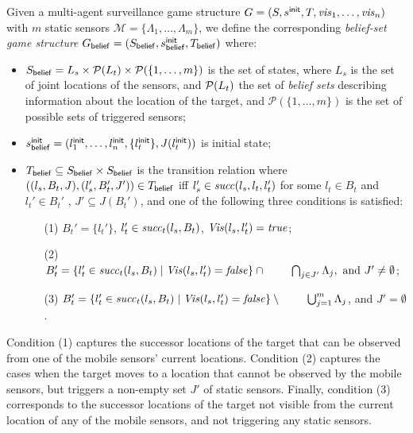 Given a  multi-agent surveillance game structure $G  = (S,s^{\mathsf{init}},T,\mathit{vis}_1,\ldots,\mathit{vis}_n)$ with $m$ static sensors $\mathcal{M} = \{\Lambda_1,\dots,\Lambda_m\}$, we define the corresponding \emph{belief-set game structure} $G_{\mathsf{belief}}  = (S_{\mathsf{belief}},s^{\mathsf{init}}_{\mathsf{belief}},T_{\mathsf{belief}})$ where:
\begin{itemize}
\item $S_{\mathsf{belief}} = L_s \times \mathcal{P}(L_t)\times \mathcal{P}(\{1,\ldots,m\})$ is the set of states, where $L_s$ is the set of joint locations of the sensors, and $\mathcal{P}(L_t)$ the set of \emph{belief sets} describing information about the location of the target, and $\mathcal{P}(\{1,\ldots,m\})$ is the set of possible sets of triggered sensors;
\item $s^{\mathsf{init}}_{\mathsf{belief}} = (l^{\mathsf{init}}_1,\ldots,l^{\mathsf{init}}_n,\{l_t^{\mathsf{init}}\},J(l_t^{\mathsf{init}}))$ is  initial state;
\item $T_{\mathsf{belief}} \subseteq S_{\mathsf{belief}} \times S_{\mathsf{belief}}$ is the transition relation where $((l_s, B_t,J),(l_s', B_t',J')) \in T_{\mathsf{belief}}$ iff $l_s' \in  \mathit{succ}(l_s,l_t,l_t')$ for some $l_t \in B_t$ and $l_t' \in B_t'$ , $J' \subseteq J(B_t')$, and one of the following three conditions is satisfied:
\begin{itemize}
\item[(1)] $B_t' = \{l_t'\}$, $l_t' \in \mathit{succ}_t(l_s,B_t)$, $\mathit{Vis}(l_s,l_t') = \mathit{true}$;
\item[(2)] $B_t' = \{l_t' \in \mathit{succ}_t(l_s,B_t)  \mid  \mathit{Vis}(l_s,l_t') = \mathit{false} \} \cap \\
\phantom{B_t' = }\bigcap_{j\in J'}\Lambda_j, \text{ and } J' \neq \emptyset $;
\item[(3)] $B_t' = \{l_t' \in \mathit{succ}_t(l_s,B_t ) \mid  \mathit{Vis}(l_s,l_t') = \mathit{false}\}\setminus\phantom{B_t' = }\bigcup_{j=1}^m \Lambda_j$, and $J' = \emptyset$.
\end{itemize}
\end{itemize}
Condition (1) captures the successor locations of the target that can be observed from one of the mobile sensors' current locations. Condition (2) captures the cases when the target moves to a location that cannot be observed by the mobile sensors, but triggers a non-empty set $J'$ of static sensors. Finally, condition (3) corresponds to the successor locations of the target not visible from the current location of any of the mobile sensors, and not triggering any static sensors.
